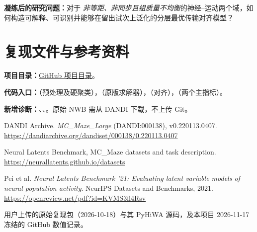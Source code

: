 \documentclass[UTF8,zihao=-4,a4paper]{ctexart}
\newcommand{\repo}{\href{https://github.com/noelabernathy400-bot/ot-hiwa/tree/main/projects/dandi-000138-hiwa-4d}{GitHub 项目目录}}
\begin{document}
\noindent\textbf{凝练后的研究问题：}对于 \emph{非等距、非同步且组质量不均衡}的神经--运动两个域，如何构造可解释、可识别并能够在留出试次上泛化的分层最优传输对齐模型？

\section*{复现文件与参考资料}
\noindent\textbf{项目目录：}\repo。\par
\begin{sloppypar}\noindent\textbf{代码入口：}（预处理及硬聚类），（原版求解器），（对齐），（两个主指标）。\par\noindent\textbf{新增诊断：}、、。原始 NWB 需从 DANDI 下载，不上传 Git。\end{sloppypar}
\vspace{5pt}
\noindent [1] DANDI Archive. \emph{MC\_Maze\_Large} (DANDI:000138), v0.220113.0407.\\\url{https://dandiarchive.org/dandiset/000138/0.220113.0407}\par
\noindent [2] Neural Latents Benchmark, MC\_Maze datasets and task description.\\\url{https://neurallatents.github.io/datasets}\par
\noindent [3] Pei et al. \emph{Neural Latents Benchmark '21: Evaluating latent variable models of neural population activity}. NeurIPS Datasets and Benchmarks, 2021.\\\url{https://openreview.net/pdf?id=KVMS3fl4Rsv}\par
\noindent [4] 用户上传的原始复现包（2026-10-18）与其 PyHiWA 源码，及本项目 2026-11-17 冻结的 GitHub 数值记录。\par
\end{document}
